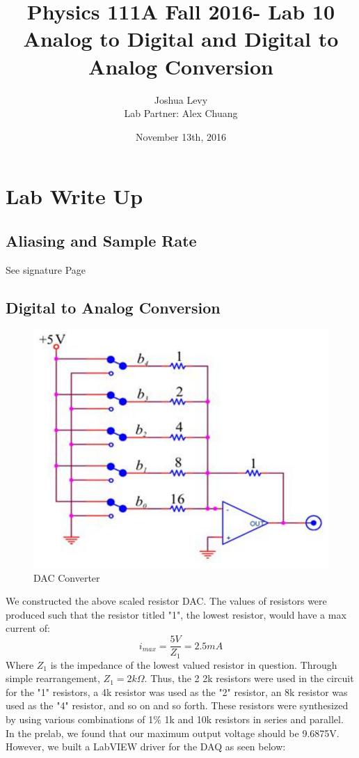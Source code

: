 \documentclass{article}
\title{Physics 111A Fall 2016- Lab 10\\Analog to Digital and Digital to Analog Conversion}
\author{Joshua Levy\\Lab Partner: Alex Chuang}
\date{November 13th, 2016}
\begin{document}
\maketitle

\section{Lab Write Up}
\subsection{Aliasing and Sample Rate}
    See signature Page
    
\subsection{Digital to Analog Conversion}
    \begin{figure}[H]
        \centering
        \includegraphics[scale = 0.5]{2a.png}
        \caption{DAC Converter \cite{lab10}}
        \label{fig:my_label}
    \end{figure}
    We constructed the above scaled resistor DAC. The values of resistors were produced such that the resistor titled "1", the lowest resistor, would have a max current of:
    \begin{equation}
        i_{max} = \frac{5V}{Z_{1}} = 2.5 mA
    \end{equation}
    Where $Z_1$ is the impedance of the lowest valued resistor in question. Through simple rearrangement, $Z_1 = 2k\Omega$. Thus, the 2 2k resistors were used in the circuit for the "1" resistors, a 4k resistor was used as the "2" resistor, an 8k resistor was used as the "4" resistor, and so on and so forth. These resistors were synthesized by using various combinations of 1$\%$ 1k and 10k resistors in series and parallel. \\\indent In the prelab, we found that our maximum output voltage should be 9.6875V. However, we built a LabVIEW driver for the DAQ as seen below:
\end{document}
